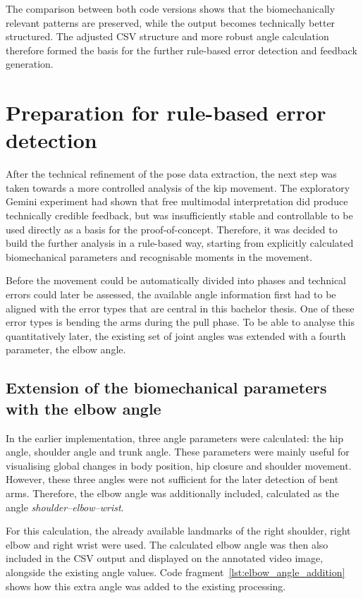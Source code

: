 The comparison between both code versions shows that the biomechanically relevant patterns are preserved, while the output becomes technically better structured. The adjusted CSV structure and more robust angle calculation therefore formed the basis for the further rule-based error detection and feedback generation.

\section{Preparation for rule-based error detection}

After the technical refinement of the pose data extraction, the next step was taken towards a more controlled analysis of the kip movement. The exploratory Gemini experiment had shown that free multimodal interpretation did produce technically credible feedback, but was insufficiently stable and controllable to be used directly as a basis for the proof-of-concept. Therefore, it was decided to build the further analysis in a rule-based way, starting from explicitly calculated biomechanical parameters and recognisable moments in the movement.

Before the movement could be automatically divided into phases and technical errors could later be assessed, the available angle information first had to be aligned with the error types that are central in this bachelor thesis. One of these error types is bending the arms during the pull phase. To be able to analyse this quantitatively later, the existing set of joint angles was extended with a fourth parameter, the elbow angle.

\subsection{Extension of the biomechanical parameters with the elbow angle}

In the earlier implementation, three angle parameters were calculated: the hip angle, shoulder angle and trunk angle. These parameters were mainly useful for visualising global changes in body position, hip closure and shoulder movement. However, these three angles were not sufficient for the later detection of bent arms. Therefore, the elbow angle was additionally included, calculated as the angle \textit{shoulder--elbow--wrist}.

For this calculation, the already available landmarks of the right shoulder, right elbow and right wrist were used. The calculated elbow angle was then also included in the CSV output and displayed on the annotated video image, alongside the existing angle values. Code fragment~\ref{lst:elbow_angle_addition} shows how this extra angle was added to the existing processing.


